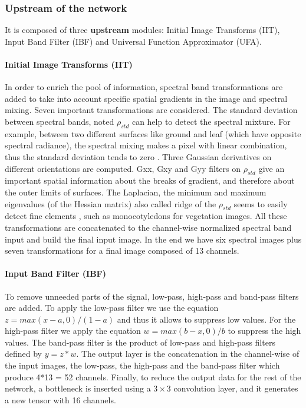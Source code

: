 \documentclass[../thesis.tex]{subfiles}
\begin{document}
    \newpage
    \subsubsection{Upstream of the network}
    It is composed of three \textbf{upstream} modules: Initial Image Transforms (IIT), Input Band Filter (IBF) and Universal  Function  Approximator  (UFA).
    \paragraph{Initial Image Transforms (IIT)} In order to enrich the pool of information, spectral band transformations are added to take into account specific spatial gradients in the image and spectral mixing. Seven important transformations are considered. The standard deviation between spectral bands, noted $\rho_{std}$ can help to detect the spectral mixture. For example, between two different surfaces like ground and leaf (which have opposite spectral radiance), the spectral mixing makes a pixel with linear combination, thus the standard deviation tends to zero \cite{Louargant2017}. Three Gaussian derivatives on different orientations are computed. Gxx, Gxy and Gyy filters on $\rho_{std}$  give an important spatial information about the breaks of gradient, and therefore about the outer limits of surfaces. The Laplacian, the minimum and maximum eigenvalues (of the Hessian matrix) also called ridge of the $\rho_{std}$ seems to easily detect fine elements \cite{LinVessel}, such as monocotyledons for vegetation images. All these transformations are concatenated to the channel-wise normalized spectral band input and build the final input image. In the end we have six spectral images plus seven transformations for a final image composed of 13 channels.
    
    \paragraph{Input Band Filter (IBF)} To remove unneeded parts of the signal, low-pass, high-pass and band-pass filters are added. To apply the low-pass filter we use the equation $z = max(x-a,0)/(1-a)$ and thus it allows to suppress low values. For the high-pass filter we apply the equation $w = max(b-x,0)/b$ to suppress the high values. The band-pass filter is the product of low-pass and high-pass filters defined by $y = z*w$. The output layer is the concatenation in the channel-wise of the input images, the low-pass, the high-pass and the band-pass filter which produce 4*13 = 52 channels. Finally, to reduce the output data for the rest of the network, a bottleneck is inserted using a $3 \times 3$ convolution layer, and it generates a new tensor with 16 channels.
    
\end{document}
